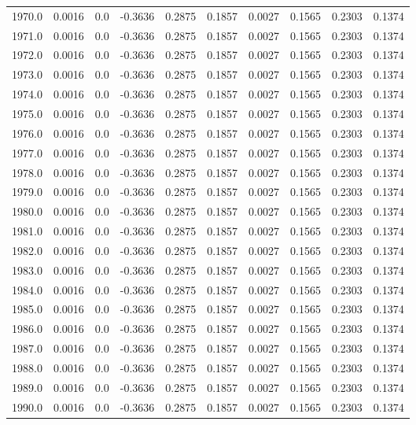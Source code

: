 \begin{longtable}{lrrrrrrrrr}
1970.0 & 0.0016 & 0.0 & -0.3636 & 0.2875 & 0.1857 & 0.0027 & 0.1565 & 0.2303 & 0.1374 \\
1971.0 & 0.0016 & 0.0 & -0.3636 & 0.2875 & 0.1857 & 0.0027 & 0.1565 & 0.2303 & 0.1374 \\
1972.0 & 0.0016 & 0.0 & -0.3636 & 0.2875 & 0.1857 & 0.0027 & 0.1565 & 0.2303 & 0.1374 \\
1973.0 & 0.0016 & 0.0 & -0.3636 & 0.2875 & 0.1857 & 0.0027 & 0.1565 & 0.2303 & 0.1374 \\
1974.0 & 0.0016 & 0.0 & -0.3636 & 0.2875 & 0.1857 & 0.0027 & 0.1565 & 0.2303 & 0.1374 \\
1975.0 & 0.0016 & 0.0 & -0.3636 & 0.2875 & 0.1857 & 0.0027 & 0.1565 & 0.2303 & 0.1374 \\
1976.0 & 0.0016 & 0.0 & -0.3636 & 0.2875 & 0.1857 & 0.0027 & 0.1565 & 0.2303 & 0.1374 \\
1977.0 & 0.0016 & 0.0 & -0.3636 & 0.2875 & 0.1857 & 0.0027 & 0.1565 & 0.2303 & 0.1374 \\
1978.0 & 0.0016 & 0.0 & -0.3636 & 0.2875 & 0.1857 & 0.0027 & 0.1565 & 0.2303 & 0.1374 \\
1979.0 & 0.0016 & 0.0 & -0.3636 & 0.2875 & 0.1857 & 0.0027 & 0.1565 & 0.2303 & 0.1374 \\
1980.0 & 0.0016 & 0.0 & -0.3636 & 0.2875 & 0.1857 & 0.0027 & 0.1565 & 0.2303 & 0.1374 \\
1981.0 & 0.0016 & 0.0 & -0.3636 & 0.2875 & 0.1857 & 0.0027 & 0.1565 & 0.2303 & 0.1374 \\
1982.0 & 0.0016 & 0.0 & -0.3636 & 0.2875 & 0.1857 & 0.0027 & 0.1565 & 0.2303 & 0.1374 \\
1983.0 & 0.0016 & 0.0 & -0.3636 & 0.2875 & 0.1857 & 0.0027 & 0.1565 & 0.2303 & 0.1374 \\
1984.0 & 0.0016 & 0.0 & -0.3636 & 0.2875 & 0.1857 & 0.0027 & 0.1565 & 0.2303 & 0.1374 \\
1985.0 & 0.0016 & 0.0 & -0.3636 & 0.2875 & 0.1857 & 0.0027 & 0.1565 & 0.2303 & 0.1374 \\
1986.0 & 0.0016 & 0.0 & -0.3636 & 0.2875 & 0.1857 & 0.0027 & 0.1565 & 0.2303 & 0.1374 \\
1987.0 & 0.0016 & 0.0 & -0.3636 & 0.2875 & 0.1857 & 0.0027 & 0.1565 & 0.2303 & 0.1374 \\
1988.0 & 0.0016 & 0.0 & -0.3636 & 0.2875 & 0.1857 & 0.0027 & 0.1565 & 0.2303 & 0.1374 \\
1989.0 & 0.0016 & 0.0 & -0.3636 & 0.2875 & 0.1857 & 0.0027 & 0.1565 & 0.2303 & 0.1374 \\
1990.0 & 0.0016 & 0.0 & -0.3636 & 0.2875 & 0.1857 & 0.0027 & 0.1565 & 0.2303 & 0.1374 \\

\end{longtable}
